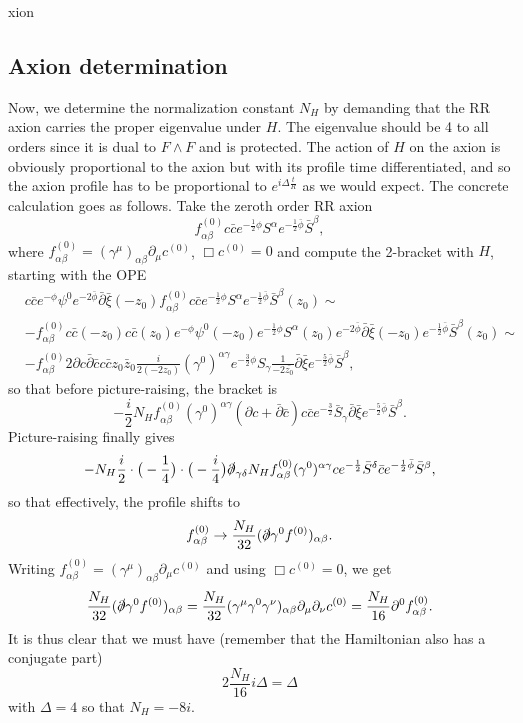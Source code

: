 xion\documentclass[12pt]{article}
\def\be{\begin{equation}}
\def\ee{\end{equation}}
\numberwithin{equation}{section}
\begin{document}
\subsection{Axion determination}
Now, we determine the normalization constant $N_H$ by demanding that the RR axion carries the proper eigenvalue under $H$. The eigenvalue should be 4 to all orders since it is dual to $F \wedge F$ and is protected. The action of $H$ on the axion is obviously proportional to the axion but with its profile time differentiated, and so the axion profile has to be proportional to $e^{i \Delta \frac{t}{R}}$ as we would expect. The concrete calculation goes as follows. Take the zeroth order RR axion
\be
f_{\alpha\beta}^{(0)} c\bar{c} e^{-\frac{1}{2}\phi} S^\alpha e^{-\frac{1}{2} \bar{\phi}} \bar{S}^\beta,
\ee
where $f_{\alpha\beta}^{(0)} = (\gamma^\mu)_{\alpha \beta} \partial_\mu c^{(0)}$, $\Box c^{(0)} = 0$ and compute the 2-bracket with $H$, starting with the OPE
\be
\begin{aligned}
&c\bar{c} e^{-\phi} \psi^0 e^{-2\bar{\phi}} \bar{\partial} \bar{\xi}(-z_0) f_{\alpha \beta}^{(0)} c\bar{c} e^{-\frac{1}{2}\phi} S^\alpha e^{-\frac{1}{2} \bar{\phi}} \bar{S}^\beta(z_0) \sim \\
&-f_{\alpha \beta}^{(0)} c\bar{c}(-z_0)c\bar{c}(z_0) e^{-\phi} \psi^0(-z_0) e^{-\frac{1}{2}\phi} S^\alpha(z_0) e^{-2\bar{\phi}} \bar{\partial}\bar{\xi}(-z_0) e^{-\frac{1}{2}\bar{\phi}} \bar{S}^\beta(z_0) \sim \\
&- f_{\alpha \beta}^{(0)} 2\partial c\bar{\partial} \bar{c} c\bar{c} z_0 \bar{z}_0 \frac{i}{2(-2z_0)} (\gamma^0)^{\alpha \gamma} e^{-\frac{3}{2}\phi} S_\gamma \frac{1}{-2\bar{z_0}} \bar{\partial}\bar{\xi} e^{-\frac{5}{2}\bar{\phi}} \bar{S}^\beta,
\end{aligned}
\ee
so that before picture-raising, the bracket is
\be
-\frac{i}{2} N_H f_{\alpha \beta}^{(0)} (\gamma^0)^{\alpha \gamma} (\partial c + \bar{\partial} \bar{c}) c\bar{c}  e^{-\frac{3}{2}} \bar{S}_\gamma \bar{\partial} \bar{\xi} e^{-\frac{5}{2} \bar{\phi}} \bar{S}^\beta.
\ee
Picture-raising finally gives
\be
- N_H\frac{i}{2} \cdot\big(- \frac{1}{4}\big) \cdot \big(-\frac{i}{4}\big) \slashed{\partial}_{\gamma \delta} N_H f_{\alpha \beta}^{(0)} (\gamma^0)^{\alpha \gamma} c  e^{-\frac{1}{2}} \bar{S}^\delta \bar{c} e^{-\frac{1}{2} \bar{\phi}} \bar{S}^\beta,
\ee
so that effectively, the profile shifts to
\be
f_{\alpha \beta}^{(0)} \to \frac{N_H}{32} (\slashed{\partial} \gamma^0 f^{(0)})_{\alpha \beta}.
\ee
Writing $f_{\alpha\beta}^{(0)} = (\gamma^\mu)_{\alpha \beta} \partial_\mu c^{(0)}$ and using $\Box c^{(0)} = 0$, we get
\be
\frac{N_H}{32} (\slashed{\partial} \gamma^0 f^{(0)})_{\alpha \beta} = \frac{N_H}{32} (\gamma^\mu \gamma^0 \gamma^\nu)_{\alpha \beta} \partial_\mu \partial_\nu c^{(0)} = \frac{N_H}{16} \partial^0 f_{\alpha \beta}^{(0)}.
\ee
It is thus clear that we must have (remember that the Hamiltonian also has a conjugate part)
\be
2\frac{N_H}{16} i \Delta = \Delta
\ee
with $\Delta = 4$ so that $N_H = -8i$.
\end{document}
